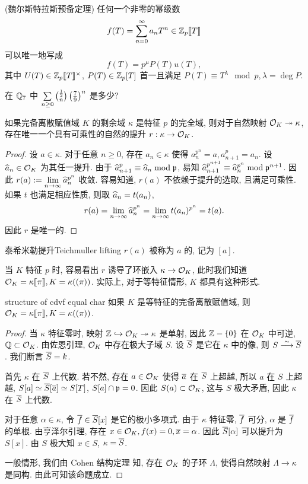 \begin{exercise}
(魏尔斯特拉斯预备定理) 任何一个非零的幂级数
	\[f(T)=\sum_{n=0}^\infty a_n T^n\in{\mathbb{Z}}_p\llbracket T\rrbracket\]
可以唯一地写成
	\[f(T)=p^\mu P(T)u(T),\]
其中 $U(T)\in{\mathbb{Z}}_p\llbracket T\rrbracket^\times$, $P(T)\in{\mathbb{Z}}_p[T]$ 首一且满足 $P(T)\equiv T^\lambda\mod p, \lambda=\deg P$.
\end{exercise}

\begin{exercise}
在 ${\mathbb{Q}}_7$ 中 $\sum\limits_{n\ge 0}{\frac{1}{2} \choose n}\left(\frac{7}{9}\right)^n$ 是多少?
\end{exercise}

\begin{proposition}{}{}
如果完备离散赋值域 $K$ 的剩余域 $\kappa$ 是特征 $p$ 的完全域, 则对于自然映射 ${\mathcal{O}}_K\twoheadrightarrow \kappa$, 存在唯一一个具有可乘性的自然的提升 $r:\kappa\to {\mathcal{O}}_K$.
\end{proposition}
\begin{proof}
设 $a\in \kappa$. 对于任意 $n\ge 0$, 存在 $a_n\in \kappa$ 使得 $a_n^{p^n}=a,a_{n+1}^p=a_n$. 设 $\widehat a_n\in{\mathcal{O}}_K$ 为其任一提升. 由于 $\widehat a_{n+1}^p\equiv \widehat a_n\bmod{\mathfrak{p}}$, 易知 $\widehat a_{n+1}^{p^{n+1}}\equiv \widehat a_n^{p^n}\bmod{\mathfrak{p}}^{n+1}$. 因此 $r(a):=\lim\limits_{n\to\infty}\widehat a_n^{p^{n}}$ 收敛. 容易知道, $r(a)$ 不依赖于提升的选取, 且满足可乘性. 如果 $t$ 也满足相应性质, 则取 $\widehat a_n=t(a_n)$, 
  \[r(a)=\lim_{n\to\infty}\widehat a_n^{p^n}=\lim_{n\to\infty}t(a_n)^{p^n}=t(a).\]
因此 $r$ 是唯一的.
\end{proof}

\begin{definition}{泰希米勒提升}{Teichmuller lifting}
$r(a)$ 被称为 $a$ 的, 记为 $[a]$.
\end{definition}

当 $K$ 特征 $p$ 时, 容易看出 $r$ 诱导了环嵌入 $\kappa\to {\mathcal{O}}_K$, 此时我们知道 ${\mathcal{O}}_K=\kappa\llbracket\pi\rrbracket,K=\kappa((\pi))$. 实际上, 对于等特征情形, $K$ 都具有这种形式.

\begin{theorem}{}{structure of cdvf equal char}
如果 $K$ 是等特征的完备离散赋值域, 则 ${\mathcal{O}}_K=\kappa\llbracket\pi\rrbracket,K=\kappa((\pi))$.
\end{theorem}
\begin{proof}
当 $\kappa$ 特征零时, 映射 ${\mathbb{Z}}\hookrightarrow {\mathcal{O}}_K\twoheadrightarrow \kappa$ 是单射, 因此 ${\mathbb{Z}}-\left\{0\right\}$ 在 ${\mathcal{O}}_K$ 中可逆, ${\mathbb{Q}}\subset {\mathcal{O}}_K$. 由佐恩引理, ${\mathcal{O}}_K$ 中存在极大子域 $S$. 设 $\overline S$ 是它在 $\kappa$ 中的像, 则 $S\stackrel{\sim}{\longrightarrow} \overline S$. 我们断言 $\overline S=k$.

首先 $\kappa$ 在 $\overline S$ 上代数. 若不然, 存在 $a\in{\mathcal{O}}_K$ 使得 $\overline a$ 在 $\overline S$ 上超越, 所以 $a$ 在 $S$ 上超越, $S[a]\simeq \overline S[\overline a]\simeq S[T]$, $S[a]\cap{\mathfrak{p}}=0$. 因此 $S(a)\subset {\mathcal{O}}_K$, 这与 $S$ 极大矛盾, 因此 $\kappa$ 在 $\overline S$ 上代数.

对于任意 $\alpha\in\kappa$, 令 $\overline f\in\overline S[x]$ 是它的极小多项式. 由于 $\kappa$ 特征零, $\overline f$ 可分, $\alpha$ 是 $\overline f$ 的单根. 由亨泽尔引理, 存在 $x\in{\mathcal{O}}_K,f(x)=0,\overline x=\alpha$. 因此 $\overline S[\alpha]$ 可以提升为 $S[x]$. 由 $S$ 极大知 $x\in S$, $\kappa=\overline S$.

一般情形, 我们由 Cohen 结构定理\cite{Cohen1946} 知, 存在 ${\mathcal{O}}_K$ 的子环 $\Lambda$, 使得自然映射 $\Lambda\to \kappa$ 是同构. 由此可知该命题成立.
\end{proof}

